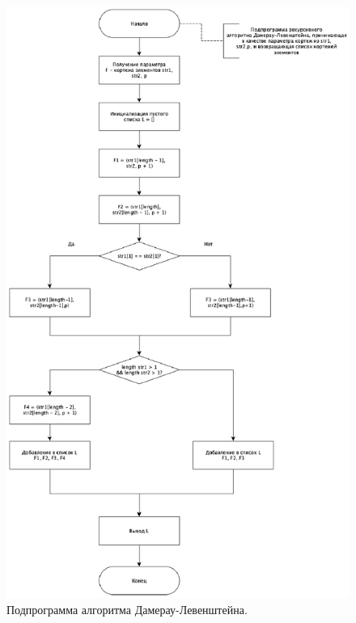 \documentclass[12pt]{report}
\begin{document}
\newpage
	
	\begin{figure}[h!]
		\centering
		\includegraphics[width=0.7\linewidth]{LevenDomerauR}
		\caption{Подпрограмма алгоритма Дамерау-Левенштейна.}
		\label{ris:image3}
	\end{figure}
	
	\newpage
	
\end{document}
